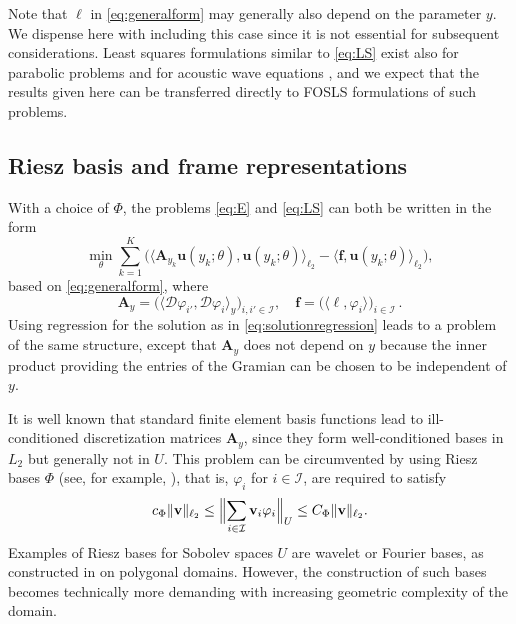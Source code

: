 \documentclass[a4paper,11pt]{amsart}
\providecommand{\norm}[1]{\lVert#1\rVert}
\providecommand{\Bignorm}[1]{\Bigl\lVert#1\Bigr\rVert}
\numberwithin{equation}{section}
\theoremstyle{definition}
\theoremstyle{remark}
\theoremstyle{plain}
\begin{document}
Note that $\ell$ in \eqref{eq:generalform} may generally also depend on the parameter $y$.
We dispense here with including this case since it is not essential for
subsequent considerations. Least squares formulations similar to \eqref{eq:LS} exist also for parabolic problems \cite{FK2021} and for acoustic wave equations \cite{FGK2023}, and we expect that the results given here can be transferred directly to FOSLS formulations of such problems.

\subsection{Riesz basis and frame representations}

With a choice of $\Phi$, the problems \eqref{eq:E} and \eqref{eq:LS} can both be written in the form
\begin{equation}\label{eq:residualregression}
    \min_\theta \sum_{k=1}^K  \bigl( \langle \mathbf A_{y_k} \mathbf u(y_k; \theta),  \mathbf u(y_k; \theta) \rangle_{\ell_2}  - \langle \mathbf f ,  \mathbf u(y_k; \theta) \rangle_{\ell_2} \bigr) ,
\end{equation}
based on \eqref{eq:generalform}, where
\begin{equation}
 \mathbf A_y = \bigl(  \langle \mathcal D \varphi_{i'}, \mathcal D \varphi_i \rangle_{y} \bigr)_{i, i' \in \mathcal I}, \quad \mathbf f = \bigl( \langle \ell, \varphi_i \rangle \bigr)_{i \in \mathcal I}  \,.
\end{equation}
Using regression for the solution as in \eqref{eq:solutionregression} leads to a problem of the same structure, except that $\mathbf A_y$ does not depend on $y$ because the inner product providing the entries of the Gramian can be chosen to be independent of $y$.

It is well known that standard finite element basis functions lead to ill-conditioned discretization matrices $\mathbf A_y$, since they form well-conditioned bases in $L_2$ but generally not in $U$.
This problem can be circumvented by using Riesz bases $\Phi$ (see, for example, \cite{Dacta,DK}), that is, $\varphi_i$ for $i \in \mathcal I$, are required to satisfy
\begin{equation}
   c_\Phi   \norm{\mathbf v}_{\ell_2}  \leq  \Bignorm{ \sum_{i \in \mathcal I} \mathbf v_i \varphi_i }_U  \leq C_\Phi   \norm{\mathbf v}_{\ell_2} .
\end{equation}
Examples of Riesz bases for Sobolev spaces $U$ are wavelet or Fourier bases, as constructed in
\cite{DSchn,DS}  on polygonal domains.
However,  the construction of such bases   becomes   technically more demanding
with increasing geometric complexity of the domain.
\end{document}
